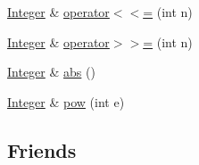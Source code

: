 \begin{DoxyCompactItemize}
\item 
\hyperlink{class_integer}{Integer} \& \hyperlink{class_integer_a4114e69e0da713f50f9cf946cfc70637}{operator$<$$<$=} (int n)
\item 
\hyperlink{class_integer}{Integer} \& \hyperlink{class_integer_a0fbada94834715ce6b91c39e5d41d24f}{operator$>$$>$=} (int n)
\item 
\hyperlink{class_integer}{Integer} \& \hyperlink{class_integer_a28b38b99580e4787e353c6630c3cf063}{abs} ()
\item 
\hyperlink{class_integer}{Integer} \& \hyperlink{class_integer_aae56deca12053a28469749c93c9f7343}{pow} (int e)
\end{DoxyCompactItemize}
\subsection*{Friends}
